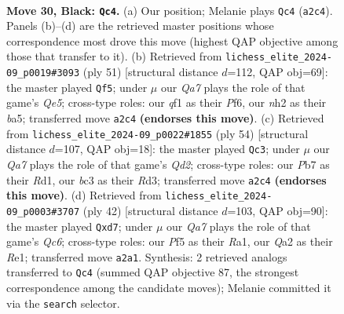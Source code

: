 \documentclass[11pt]{article}
\begin{document}
\clearpage

\begin{figure}[p]\centering
\begin{subfigure}{0.46\textwidth}\centering
\resizebox{\linewidth}{!}{%
\newchessgame
\chessboard[
  setfen={rk3b2/pp4pr/2p1b2p/P2p1p2/3P3P/2B1P3/qPK2PPN/R4Q1R b - - 12 30},
  showmover=false,
  pgfstyle=straightmove, color=movearrow, markmove={a2-c4}
]}
\caption{}
\end{subfigure}\hfill
\begin{subfigure}{0.46\textwidth}\centering
\resizebox{\linewidth}{!}{%
\newchessgame
\chessboard[
  setfen={2r2r1k/4b2p/p2ppppP/Bp6/4q3/P3R3/1PPQ1PP1/1K1R4 b - - 1 26},
  showmover=false,
  pgfstyle=straightmove, color=movearrow, markmove={e4-f5}
]}
\caption{}
\end{subfigure}
\\[4pt]
\begin{subfigure}{0.46\textwidth}\centering
\resizebox{\linewidth}{!}{%
\newchessgame
\chessboard[
  setfen={2rq2k1/p2r1p1p/p1p1p1p1/2B3b1/2PP4/1P1R2P1/P2Q1PKP/3R4 w - - 16 28},
  showmover=false,
  pgfstyle=straightmove, color=movearrow, markmove={d2-c3}
]}
\caption{}
\end{subfigure}\hfill
\begin{subfigure}{0.46\textwidth}\centering
\resizebox{\linewidth}{!}{%
\newchessgame
\chessboard[
  setfen={r3rk2/3q2p1/1pQpb2p/p4p2/3P4/P1P5/1P1B1PPP/R3R1K1 w - - 1 22},
  showmover=false,
  pgfstyle=straightmove, color=movearrow, markmove={c6-d7}
]}
\caption{}
\end{subfigure}
\caption{\textbf{Move 30, Black: \texttt{Qc4}.} (a) Our position; Melanie plays \texttt{Qc4} (\texttt{a2c4}). Panels (b)--(d) are the retrieved master positions whose correspondence most drove this move (highest QAP objective among those that transfer to it). (b) Retrieved from \texttt{lichess\_elite\_2024-09\_p0019\#3093} (ply 51) [structural distance $d$=112, QAP obj=69]: the master played \texttt{Qf5}; under $\mu$ our \emph{Qa7} plays the role of that game's \emph{Qe5}; cross-type roles: our \emph{q}f1 as their \emph{P}f6, our \emph{n}h2 as their \emph{b}a5; transferred move \texttt{a2c4} \textbf{(endorses this move)}. (c) Retrieved from \texttt{lichess\_elite\_2024-09\_p0022\#1855} (ply 54) [structural distance $d$=107, QAP obj=18]: the master played \texttt{Qc3}; under $\mu$ our \emph{Qa7} plays the role of that game's \emph{Qd2}; cross-type roles: our \emph{P}b7 as their \emph{R}d1, our \emph{b}c3 as their \emph{R}d3; transferred move \texttt{a2c4} \textbf{(endorses this move)}. (d) Retrieved from \texttt{lichess\_elite\_2024-09\_p0003\#3707} (ply 42) [structural distance $d$=103, QAP obj=90]: the master played \texttt{Qxd7}; under $\mu$ our \emph{Qa7} plays the role of that game's \emph{Qc6}; cross-type roles: our \emph{P}f5 as their \emph{R}a1, our \emph{Q}a2 as their \emph{R}e1; transferred move \texttt{a2a1}. Synthesis: 2 retrieved analogs transferred to \texttt{Qc4} (summed QAP objective 87, the strongest correspondence among the candidate moves); Melanie committed it via the \texttt{search} selector.}
\label{fig:thought-m59}
\end{figure}
\end{document}

